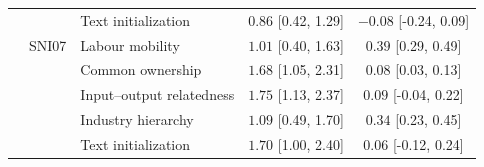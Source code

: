 \begin{table}[htbp]
\begin{tabular}{lllcc}
 &  & Text initialization & $0.86$ [0.42, 1.29] & $-0.08$ [-0.24, 0.09] \\
\addlinespace[2pt]
 & SNI07 & Labour mobility & $1.01$ [0.40, 1.63] & $0.39$ [0.29, 0.49] \\
 &  & Common ownership & $1.68$ [1.05, 2.31] & $0.08$ [0.03, 0.13] \\
 &  & Input--output relatedness & $1.75$ [1.13, 2.37] & $0.09$ [-0.04, 0.22] \\
 &  & Industry hierarchy & $1.09$ [0.49, 1.70] & $0.34$ [0.23, 0.45] \\
 &  & Text initialization & $1.70$ [1.00, 2.40] & $0.06$ [-0.12, 0.24] \\
\bottomrule
\end{tabular}
\end{table}
